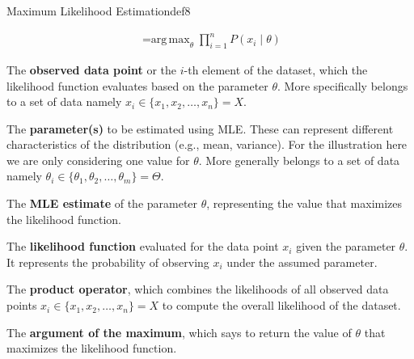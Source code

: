 \documentclass[
  12 pt,
  a4paper,
]{book}
\numberwithin{equation}{section}
\theoremstyle{plain}      %
\theoremstyle{definition} %
\theoremstyle{remark}     %
\theoremstyle{note}         %
\begin{document}
\begin{a_def_eq}{Maximum Likelihood Estimation}{def8} 

\begin{align}
\mathop{\hat{\theta} = \mathrm{arg\,max}}_{\theta} \prod_{i=1}^n P(x_i\! \mid\! \theta)
\end{align}

\begin{description}[align=left, labelwidth=2cm, labelsep=0em, leftmargin=2cm]
    \item[$x_i$] The \textbf{observed data point} or the \( i \)-th element of the dataset, which the likelihood function evaluates based on the parameter \( \theta \). More specifically belongs to a set of data namely $x_i \in \{ x_1, x_2, \dots, x_n \} = X$.
    \vspace{0.5\baselineskip}
    \item[$\theta$] The \textbf{parameter(s)} to be estimated using MLE. These can represent different characteristics of the distribution (e.g., mean, variance). For the illustration here we are only considering one value for $\theta$. More generally belongs to a set of data namely $\theta_i \in \{ \theta_1, \theta_2, \dots, \theta_m \} = \Theta$.
    \vspace{0.5\baselineskip}
    \item[$\hat{\theta}$] The \textbf{MLE estimate} of the parameter $\theta$, representing the value that maximizes the likelihood function.
    \vspace{0.5\baselineskip}
    \item[$P(x_i | \theta)$] The \textbf{likelihood function} evaluated for the data point $ x_i$ given the parameter $\theta$. It represents the probability of observing $x_i$ under the assumed parameter.
    \vspace{-0.3\baselineskip}
    \item[$\prod$] The \textbf{product operator}, which combines the likelihoods of all observed data points $x_i \in \{ x_1, x_2, \dots, x_n \} = X$ to compute the overall likelihood of the dataset.
    \vspace{0.5\baselineskip}
    \item[$\underset{\theta}{\mathop{\mathrm{arg\,max}}}$] The \textbf{argument of the maximum}, which says to return the value of \( \theta \) that maximizes the likelihood function.
    \vspace{0.5\baselineskip}
\end{description}

\end{a_def_eq}
\end{document}
